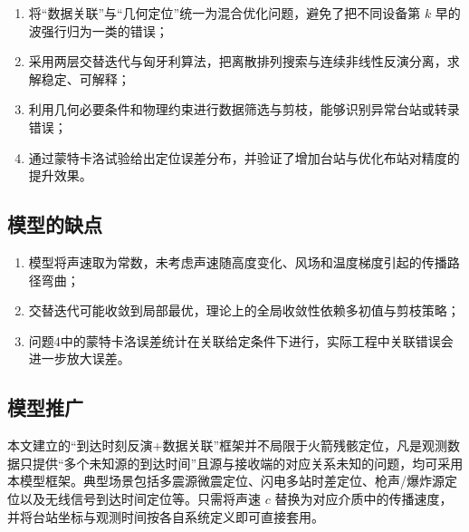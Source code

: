 \documentclass[12pt,a4paper]{article}
\newcommand{\warning}[1]{\par\noindent\textbf{【高频失分点】} #1\par}
\begin{document}
\begin{enumerate}[label=\arabic*.]
  \item 将“数据关联”与“几何定位”统一为混合优化问题，避免了把不同设备第 $k$ 早的波强行归为一类的错误；
  \item 采用两层交替迭代与匈牙利算法，把离散排列搜索与连续非线性反演分离，求解稳定、可解释；
  \item 利用几何必要条件和物理约束进行数据筛选与剪枝，能够识别异常台站或转录错误；
  \item 通过蒙特卡洛试验给出定位误差分布，并验证了增加台站与优化布站对精度的提升效果。
\end{enumerate}

\subsection{模型的缺点}


\begin{enumerate}[label=\arabic*.]
  \item 模型将声速取为常数，未考虑声速随高度变化、风场和温度梯度引起的传播路径弯曲；
  \item 交替迭代可能收敛到局部最优，理论上的全局收敛性依赖多初值与剪枝策略；
  \item 问题4中的蒙特卡洛误差统计在关联给定条件下进行，实际工程中关联错误会进一步放大误差。
\end{enumerate}


\subsection{模型推广}

本文建立的“到达时刻反演+数据关联”框架并不局限于火箭残骸定位，凡是观测数据只提供“多个未知源的到达时间”且源与接收端的对应关系未知的问题，均可采用本模型框架。典型场景包括多震源微震定位、闪电多站时差定位、枪声/爆炸源定位以及无线信号到达时间定位等。只需将声速 $c$ 替换为对应介质中的传播速度，并将台站坐标与观测时间按各自系统定义即可直接套用。
\end{document}
